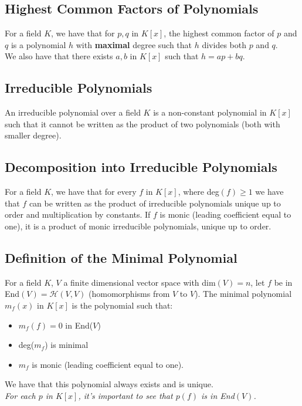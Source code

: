 \documentclass[a4paper, 12pt, twoside]{article}
\begin{document}
\subsection{Highest Common Factors of Polynomials}

For a field $K$, we have that for $p, q$ in $K[x]$, the highest common factor of $p$ and $q$
is a polynomial $h$ with \textbf{maximal} degree such that $h$ divides both $p$ and $q$.
\\[\baselineskip]
We also have that there exists $a, b$ in $K[x]$ such that $h = ap + bq$.

\subsection{Irreducible Polynomials}

An irreducible polynomial over a field $K$ is a non-constant polynomial in $K[x]$ such that
it cannot be written as the product of two polynomials (both with smaller degree).

\subsection{Decomposition into Irreducible Polynomials}

For a field $K$, we have that for every $f$ in $K[x]$, where deg$(f) \geq 1$ we have that 
$f$ can be written as the product of irreducible polynomials unique up to order and
multiplication by constants. If $f$ is monic (leading coefficient equal to one), 
it is a product of monic irreducible polynomials, unique up to order.

\subsection{Definition of the Minimal Polynomial}

For a field $K$, $V$ a finite dimensional vector space with dim$(V) = n$, let $f$ be in
End$(V) = \mathcal{H}(V, V)$ (homomorphisms from $V$ to $V$). 
The minimal polynomial $m_f(x)$ in $K[x]$ is the polynomial such that: \begin{itemize}
  \item $m_f(f) = 0$ in End($V$)
  \item deg($m_f$) is minimal
  \item $m_f$ is monic (leading coefficient equal to one).
\end{itemize} We have that this polynomial always exists and is unique.
\\[\baselineskip]
\textit{For each $p$ in $K[x]$, it's important to see that
$p(f)$ is in End$(V)$.}
\end{document}
